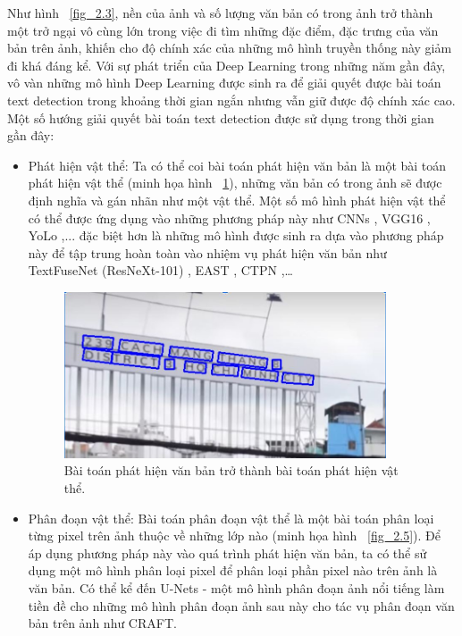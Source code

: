 Như hình ~\ref{fig_2.3}, nền của ảnh và số lượng văn bản có trong ảnh trở thành một trở ngại vô
cùng lớn trong việc đi tìm những đặc điểm, đặc trưng của văn bản trên ảnh, khiến cho độ
chính xác của những mô hình truyền thống này giảm đi khá đáng kể.
Với sự phát triển của Deep Learning trong những năm gần đây, vô vàn những mô hình Deep
Learning được sinh ra để giải quyết được bài toán text detection trong khoảng thời gian ngắn
nhưng vẫn giữ được độ chính xác cao. Một số hướng giải quyết bài toán text detection
được sử dụng trong thời gian gần đây:
\begin{itemize}
    \item Phát hiện vật thể: Ta có thể coi bài toán phát hiện văn bản là một bài toán phát hiện
vật thể (minh họa hình ~\ref{fig_2.4}), những văn bản có trong ảnh sẽ được định nghĩa và gán nhãn như một vật
thể. Một số mô hình phát hiện vật thể có thể được ứng dụng vào những phương
pháp này như CNNs \cite{delakis2008text}, VGG16 \cite{he2020realtime}, YoLo \cite{haifeng2020natural},... đặc biệt hơn là những mô hình
được sinh ra dựa vào phương pháp này để tập trung hoàn toàn vào nhiệm vụ phát
hiện văn bản như TextFuseNet (ResNeXt-101) \cite{ye2020textfusenet}, EAST \cite{zhou2017east}, CTPN \cite{tian2016detecting},…

\begin{figure}
\centering
\includegraphics[width=0.9\textwidth]{mep_img/Capture2.JPG}
\caption{Bài toán phát hiện văn bản trở thành bài toán phát hiện vật thể.}\label{fig_2.4}
\end{figure}


\item Phân đoạn vật thể: Bài toán phân đoạn vật thể là một bài toán phân loại từng pixel
trên ảnh thuộc về những lớp nào (minh họa hình ~\ref{fig_2.5}). Để áp dụng phương pháp này vào quá trình phát
hiện văn bản, ta có thể sử dụng một mô hình phân loại pixel để phân loại phần pixel
nào trên ảnh là văn bản. Có thể kể đến U-Nets\cite{fink2018baseline} - một mô hình phân đoạn
ảnh nổi tiếng làm tiền đề cho những mô hình phân đoạn ảnh sau này cho tác vụ
phân đoạn văn bản trên ảnh như CRAFT\cite{baek2019character}.


\end{itemize}
